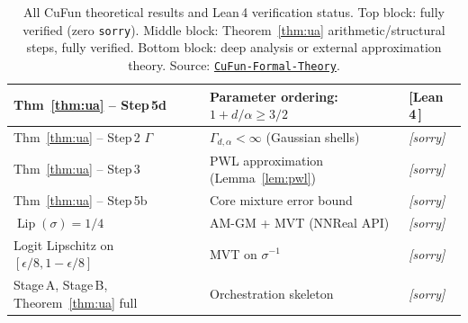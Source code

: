 \documentclass[11pt]{article}
\theoremstyle{remark}
\newcommand{\verified}{%
  \textcolor{green!60!black}{\textbf{[Lean\,4\,\checkmark]}}}
\newcommand{\sorrymark}{%
  \textcolor{orange!60!black}{\textit{[sorry]}}}
\newcommand{\sigmoid}{\sigma}
\begin{document}
\begin{table}[h!]
\begin{tabular}{>{\raggedright}p{5.2cm} p{6.5cm} l}
Thm~\ref{thm:ua} -- Step\,5d & Parameter ordering: $1 + d/\alpha \ge 3/2$ & \verified{} \\
\midrule
Thm~\ref{thm:ua} -- Step\,2 $\Gamma$ & $\Gamma_{d,\alpha} < \infty$ (Gaussian shells) & \sorrymark{} \\
Thm~\ref{thm:ua} -- Step\,3 & PWL approximation (Lemma~\ref{lem:pwl}) & \sorrymark{} \\
Thm~\ref{thm:ua} -- Step\,5b & Core mixture error bound & \sorrymark{} \\
$\operatorname{Lip}(\sigmoid)=1/4$ & AM-GM + MVT (NNReal API) & \sorrymark{} \\
Logit Lipschitz on $[\epsilon/8,1-\epsilon/8]$ & MVT on $\sigmoid^{-1}$ & \sorrymark{} \\
Stage\,A, Stage\,B, Theorem~\ref{thm:ua} full & Orchestration skeleton & \sorrymark{} \\
\bottomrule
\end{tabular}
\caption{All CuFun theoretical results and Lean\,4 verification status.
Top block: fully verified (zero \texttt{sorry}).
Middle block: Theorem~\ref{thm:ua} arithmetic/structural steps, fully verified.
Bottom block: deep analysis or external approximation theory.
Source: \href{https://github.com/MorinClaw/CuFun-Formal-Theory}{\texttt{CuFun-Formal-Theory}}.}
\label{tab:summary}
\end{table}
\end{document}
